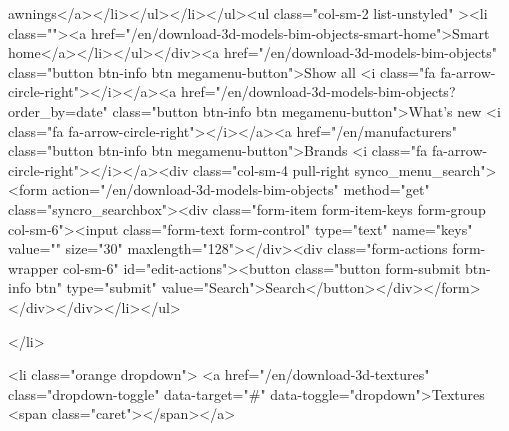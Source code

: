 awnings</a></li></ul></li></ul><ul class="col-sm-2 list-unstyled" ><li class=""><a href="/en/download-3d-models-bim-objects-smart-home">Smart home</a></li></ul></div><a href="/en/download-3d-models-bim-objects" class="button btn-info btn megamenu-button">Show all <i class="fa fa-arrow-circle-right"></i></a><a href="/en/download-3d-models-bim-objects?order_by=date" class="button btn-info btn megamenu-button">What's new <i class="fa fa-arrow-circle-right"></i></a><a href="/en/manufacturers" class="button btn-info btn megamenu-button">Brands <i class="fa fa-arrow-circle-right"></i></a><div class="col-sm-4 pull-right synco_menu_search"><form action="/en/download-3d-models-bim-objects" method="get" class="syncro_searchbox"><div class="form-item form-item-keys form-group col-sm-6"><input class="form-text form-control" type="text" name="keys" value="" size="30" maxlength="128"></div><div class="form-actions form-wrapper col-sm-6" id="edit-actions"><button class="button form-submit btn-info btn" type="submit" value="Search">Search</button></div></form></div></div></li></ul>
          
            </li>
        
                   
            
      
                            
    

                   
        <li class="orange dropdown">
        <a href="/en/download-3d-textures" class="dropdown-toggle" data-target="#" data-toggle="dropdown">Textures <span class="caret"></span></a>
            
